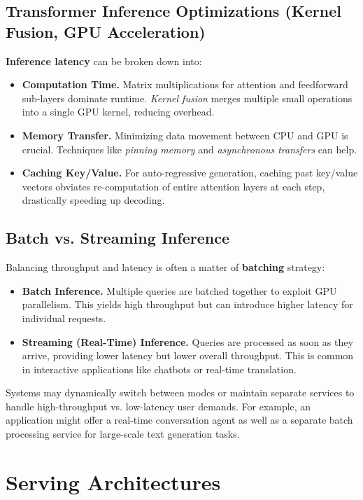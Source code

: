 \subsection{Transformer Inference Optimizations (Kernel Fusion, GPU Acceleration)}
\noindent
\textbf{Inference latency} can be broken down into:
\begin{itemize}
    \item \textbf{Computation Time.} Matrix multiplications for attention and feedforward sub-layers dominate runtime. \emph{Kernel fusion} merges multiple small operations into a single GPU kernel, reducing overhead. 
    \item \textbf{Memory Transfer.} Minimizing data movement between CPU and GPU is crucial. Techniques like \emph{pinning memory} and \emph{asynchronous transfers} can help.
    \item \textbf{Caching Key/Value.} For auto-regressive generation, caching past key/value vectors obviates re-computation of entire attention layers at each step, drastically speeding up decoding.
\end{itemize}

\subsection{Batch vs. Streaming Inference}
\noindent
Balancing throughput and latency is often a matter of \textbf{batching} strategy:
\begin{itemize}
    \item \textbf{Batch Inference.} Multiple queries are batched together to exploit GPU parallelism. This yields high throughput but can introduce higher latency for individual requests.
    \item \textbf{Streaming (Real-Time) Inference.} Queries are processed as soon as they arrive, providing lower latency but lower overall throughput. This is common in interactive applications like chatbots or real-time translation.
\end{itemize}

\noindent
Systems may dynamically switch between modes or maintain separate services to handle high-throughput vs. low-latency user demands. For example, an application might offer a real-time conversation agent as well as a separate batch processing service for large-scale text generation tasks.

\section{Serving Architectures}
\label{sec:serving_architectures}

